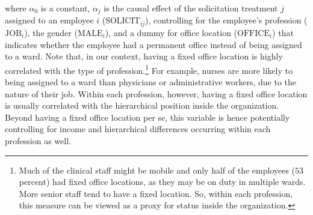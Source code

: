 \documentclass[12pt, titlepage]{article}
\begin{document}
where \(\alpha_0\) is a constant, \(\alpha_j\) is the causal effect of
the solicitation treatment \(j\) assigned to an employee \(i\)
(\(\text{SOLICIT}_{ij}\)), controlling for the employee's profession
(\(\text{JOB}_i\)), the gender (\(\text{MALE}_i\)), and a dummy for
office location (\(\text{OFFICE}_i\)) that indicates whether the
employee had a permanent office instead of being assigned to a ward.
Note that, in our context, having a fixed office location is highly
correlated with the type of profession.\footnote{Much of the clinical
  staff might be mobile and only half of the employees (\(53\) percent)
  had fixed office locations, as they may be on duty in multiple wards.
  More senior staff tend to have a fixed location. So, within each
  profession, this measure can be viewed as a proxy for status inside
  the organization.} For example, nurses are more likely to being
assigned to a ward than physicians or administrative workers, due to the
nature of their job. Within each profession, however, having a fixed
office location is usually correlated with the hierarchical position
inside the organization. Beyond having a fixed office location per se,
this variable is hence potentially controlling for income and
hierarchical differences occurring within each profession as well.
\end{document}

